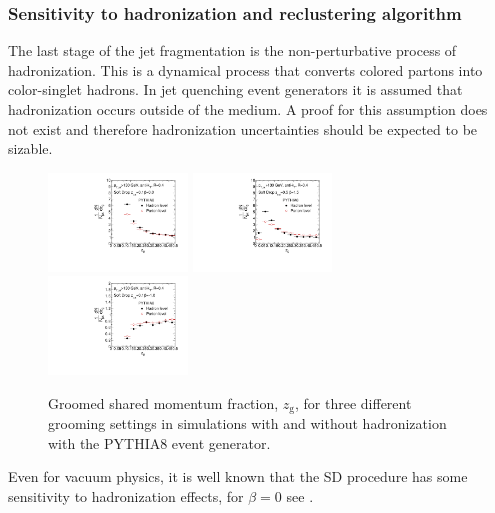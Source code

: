 \subsubsection{Sensitivity to hadronization and reclustering algorithm}
\label{sec:hadronization}


The last stage of the jet fragmentation is the non-perturbative process of hadronization. This is a dynamical process that converts colored partons into color-singlet hadrons. In jet quenching event generators it is assumed that hadronization occurs outside of the medium. A proof for this assumption does not exist and therefore hadronization uncertainties should be expected to be sizable. 

\begin{figure}[th]
\centering
\includegraphics[width=0.33\textwidth]{figures/SDGen/ZgPytHadVsPartBeta00Z01.pdf}%
\includegraphics[width=0.33\textwidth]{figures/SDGen/ZgPytHadVsPartBeta15Z05.pdf}%
\includegraphics[width=0.33\textwidth]{figures/SDGen/ZgPytHadVsPartBetam1Z01.pdf}%
\caption{Groomed shared momentum fraction, $z_{\mathrm{g}}$, for three different grooming settings in simulations with and without hadronization with the PYTHIA8 event generator.}
\label{fig:SDGenZGHadVsPart}
\end{figure}
Even for vacuum physics, it is well known that the SD procedure has some sensitivity to hadronization effects, for $\beta = 0$ see \cite{Dasgupta:2015yua}.
